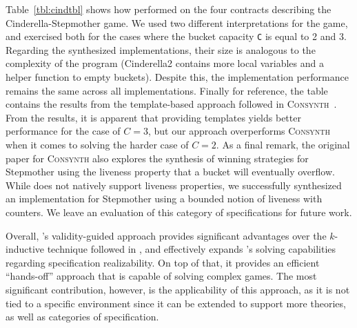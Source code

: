 Table~\ref{tbl:cindtbl} shows how \jsynvg performed on the four contracts describing the Cinderella-Stepmother game. We used two different interpretations for the game, and exercised both for the cases where the bucket capacity  \texttt{C} is equal to 2 and 3. Regarding the synthesized implementations, their size is analogous to the complexity of the program (Cinderella2 contains more local variables and a helper function to empty buckets). Despite this, the implementation performance remains the same across all implementations. Finally for reference, the table contains the results from the template-based approach followed in \textsc{Consynth}~\cite{beyene2014constraint}. From the results, it is apparent that providing templates yields better performance for the case of $C = 3$, but our approach overperforms \textsc{Consynth} when it comes to solving the harder case of $C = 2$. As a final remark, the original paper for \textsc{Consynth} also explores the synthesis of winning strategies for Stepmother using the liveness property that a bucket will eventually overflow. While \jkind does not natively support liveness properties, we successfully synthesized an implementation for Stepmother using a bounded notion of liveness with counters. We leave an evaluation of this category of specifications for future work.

Overall, \jsynvg's validity-guided approach provides significant advantages
over the $k$-inductive technique followed in \jsyn, and effectively expands
\jkind's solving capabilities regarding specification realizability. On top of that, it provides an efficient ``hands-off'' approach that is capable of solving complex games.
The most significant contribution, however, is the applicability of this approach, as it is not tied to a specific environment since it can be extended to support more
theories, as well as categories of specification. 